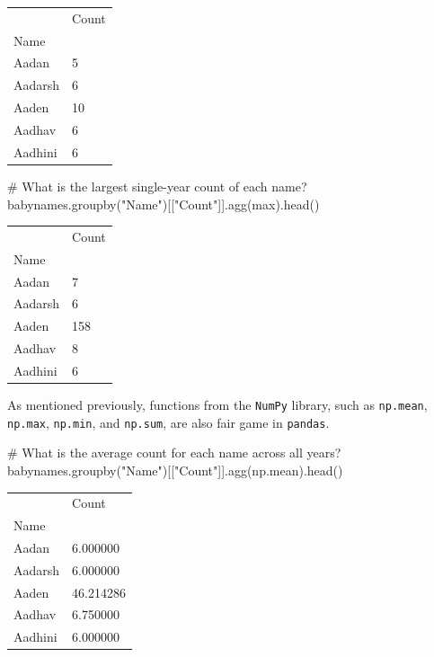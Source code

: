 \documentclass[
  letterpaper,
  DIV=11,
  numbers=noendperiod]{scrreprt}
\newenvironment{Shaded}{\begin{snugshade}}{\end{snugshade}}
\newcommand{\BuiltInTok}[1]{\textcolor[rgb]{0.00,0.23,0.31}{#1}}
\newcommand{\CommentTok}[1]{\textcolor[rgb]{0.37,0.37,0.37}{#1}}
\newcommand{\NormalTok}[1]{\textcolor[rgb]{0.00,0.23,0.31}{#1}}
\newcommand{\StringTok}[1]{\textcolor[rgb]{0.13,0.47,0.30}{#1}}
\begin{document}
\begin{longtable}[]{@{}ll@{}}
\toprule\noalign{}
& Count \\
Name & \\
\midrule\noalign{}
\endhead
\bottomrule\noalign{}
\endlastfoot
Aadan & 5 \\
Aadarsh & 6 \\
Aaden & 10 \\
Aadhav & 6 \\
Aadhini & 6 \\
\end{longtable}

\begin{Shaded}
\begin{Highlighting}[]
\CommentTok{\# What is the largest single{-}year count of each name?}
\NormalTok{babynames.groupby(}\StringTok{"Name"}\NormalTok{)[[}\StringTok{"Count"}\NormalTok{]].agg(}\BuiltInTok{max}\NormalTok{).head()}
\end{Highlighting}
\end{Shaded}

\begin{longtable}[]{@{}ll@{}}
\toprule\noalign{}
& Count \\
Name & \\
\midrule\noalign{}
\endhead
\bottomrule\noalign{}
\endlastfoot
Aadan & 7 \\
Aadarsh & 6 \\
Aaden & 158 \\
Aadhav & 8 \\
Aadhini & 6 \\
\end{longtable}

As mentioned previously, functions from the \texttt{NumPy} library, such
as \texttt{np.mean}, \texttt{np.max}, \texttt{np.min}, and
\texttt{np.sum}, are also fair game in \texttt{pandas}.

\begin{Shaded}
\begin{Highlighting}[]
\CommentTok{\# What is the average count for each name across all years?}
\NormalTok{babynames.groupby(}\StringTok{"Name"}\NormalTok{)[[}\StringTok{"Count"}\NormalTok{]].agg(np.mean).head()}
\end{Highlighting}
\end{Shaded}

\begin{longtable}[]{@{}ll@{}}
\toprule\noalign{}
& Count \\
Name & \\
\midrule\noalign{}
\endhead
\bottomrule\noalign{}
\endlastfoot
Aadan & 6.000000 \\
Aadarsh & 6.000000 \\
Aaden & 46.214286 \\
Aadhav & 6.750000 \\
Aadhini & 6.000000 \\
\end{longtable}
\end{document}
